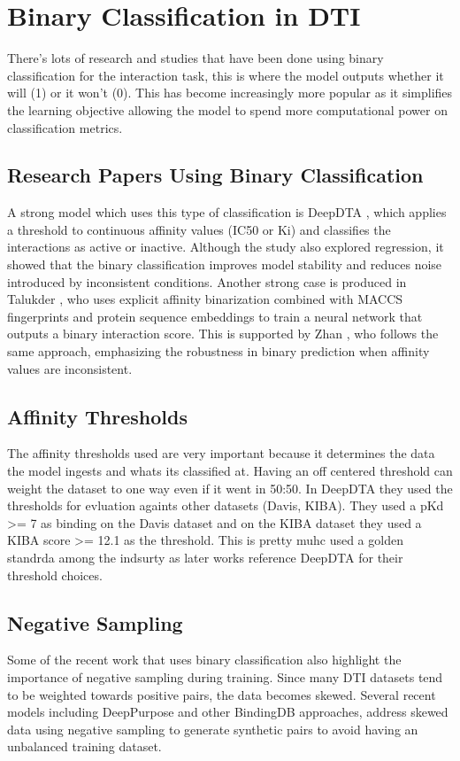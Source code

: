 \section{Binary Classification in DTI}
There's lots of research and studies that have been done using binary classification for the interaction task, this is where the model outputs whether it will (1) or it won't (0). This has become increasingly more popular as it simplifies the learning objective allowing the model to spend more computational power on classification metrics.

\subsection{Research Papers Using Binary Classification}
A strong model which uses this type of classification is DeepDTA \citep{Ozturk2018}, which applies a threshold to continuous affinity values (IC50 or Ki) and classifies the interactions as active or inactive. Although the study also explored regression, it showed that the binary classification improves model stability and reduces noise introduced by inconsistent conditions.
Another strong case is produced in Talukder \citep{Talukder2025}, who uses explicit affinity binarization combined with MACCS fingerprints and protein sequence embeddings to train a neural network that outputs a binary interaction score. This is supported by Zhan \citep{Zhan2025}, who follows the same approach, emphasizing the robustness in binary prediction when affinity values are inconsistent. 

\subsection{Affinity Thresholds}
The affinity thresholds used are very important because it determines the data the model ingests and whats its classified at. Having an off centered threshold can weight the dataset to one way even if it went in 50:50. In DeepDTA \citep{Ozturk2018} they used the thresholds for evluation againts other datasets (Davis, KIBA). They used a pKd >= 7 as binding on the Davis dataset and on the KIBA dataset they used a KIBA score >= 12.1 as the threshold. This is pretty muhc used a golden standrda among the indsurty as later works reference DeepDTA for their threshold choices.

\subsection{Negative Sampling}
Some of the recent work that uses binary classification also highlight the importance of negative sampling during training. Since many DTI datasets tend to be weighted towards positive pairs, the data becomes skewed. Several recent models including DeepPurpose \citep{DeepLearning} and other BindingDB approaches, address skewed data using negative sampling to generate synthetic pairs to avoid having an unbalanced training dataset.

